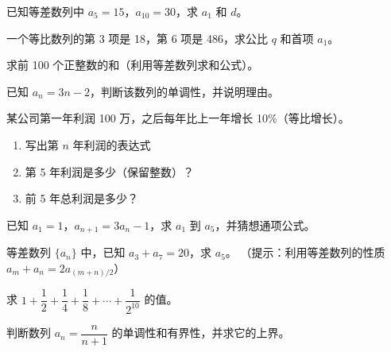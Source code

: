 
\begin{exercise}[2]
已知等差数列中 \(a_5 = 15\)，\(a_{10} = 30\)，求 \(a_1\) 和 \(d\)。
\end{exercise}

\begin{exercise}[2]
一个等比数列的第 3 项是 18，第 6 项是 486，求公比 \(q\) 和首项 \(a_1\)。
\end{exercise}

\begin{exercise}[2]
求前 100 个正整数的和（利用等差数列求和公式）。
\end{exercise}

\begin{exercise}[2]
已知 \(a_n = 3n - 2\)，判断该数列的单调性，并说明理由。
\end{exercise}


\begin{exercise}[3]
某公司第一年利润 100 万，之后每年比上一年增长 10\%（等比增长）。
\begin{enumerate}
  \item[(1)] 写出第 \(n\) 年利润的表达式
  \item[(2)] 第 5 年利润是多少（保留整数）？
  \item[(3)] 前 5 年总利润是多少？
\end{enumerate}
\end{exercise}

\begin{exercise}[3]
已知 \(a_1 = 1\)，\(a_{n+1} = 3a_n - 1\)，求 \(a_1\) 到 \(a_5\)，并猜想通项公式。
\end{exercise}

\begin{exercise}[3]
等差数列 \(\{a_n\}\) 中，已知 \(a_3 + a_7 = 20\)，求 \(a_5\)。
（提示：利用等差数列的性质 \(a_m + a_n = 2a_{(m+n)/2}\)）
\end{exercise}

\begin{exercise}[3]
求 \(1 + \dfrac{1}{2} + \dfrac{1}{4} + \dfrac{1}{8} + \cdots + \dfrac{1}{2^{10}}\) 的值。
\end{exercise}

\begin{exercise}[3]
判断数列 \(a_n = \dfrac{n}{n+1}\) 的单调性和有界性，并求它的上界。
\end{exercise}


